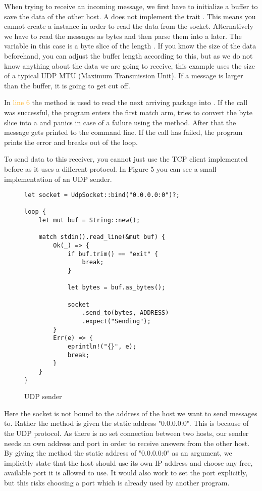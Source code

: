 When trying to receive an incoming message, we first have to initialize a buffer to save the data of the other host.
A  does not implement the trait . This means you cannot create a 
instance in order to read the data from the socket. Alternatively we have to read the messages as bytes and then parse
them into a  later. The variable  in this case is a byte slice of the length . If you
know the size of the data beforehand, you can adjust the buffer length according to this, but as we do not know
anything about the data we are going to receive, this example uses the size of a typical UDP MTU (Maximum Transmission
Unit). If a message is larger than the buffer, it is going to get cut off.

In \textcolor{orange}{line 6} the method  is used to read the next arriving package into . If
the call was successful, the program enters the first match arm, tries to convert the byte slice into a  and
panics in case of a failure using the  method. After that the message gets printed to the command line. If
the call has failed, the program prints the error and breaks out of the loop.

To send data to this receiver, you cannot just use the TCP client implemented before as it uses a different protocol. In
Figure 5 you can see a small implementation of an UDP sender.

\begin{figure}[ht]
    \begin{verbatim}
let socket = UdpSocket::bind("0.0.0.0:0")?;

loop {
    let mut buf = String::new();

    match stdin().read_line(&mut buf) {
        Ok(_) => {
            if buf.trim() == "exit" {
                break;
            }

            let bytes = buf.as_bytes();

            socket
                .send_to(bytes, ADDRESS)
                .expect("Sending");
        }
        Err(e) => {
            eprintln!("{}", e);
            break;
        }
    }
}
    \end{verbatim}
    \caption{UDP sender}
\end{figure}

Here the socket is not bound to the address of the host we want to send messages to. Rather the  method is
given the static address "0.0.0.0:0". This is because of the UDP protocol. As there is no set connection between two
hosts, our sender needs an own address and port in order to receive answers from the other host. By giving the
 method the static address of "0.0.0.0:0" as an argument, we implicitly state that the host should use its
own IP address and choose any free, available port it is allowed to use. It would also work to set the port explicitly,
but this risks choosing a port which is already used by another program.


